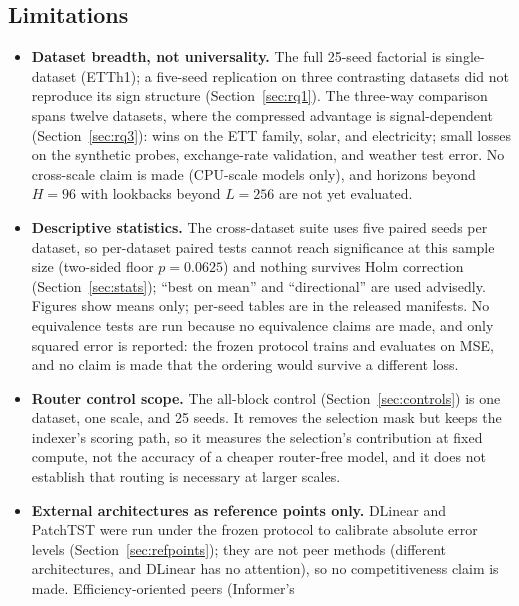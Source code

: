 \subsection{Limitations}
\label{sec:limitations}
\begin{itemize}
  \item \textbf{Dataset breadth, not universality.} The full 25-seed factorial is
        single-dataset (ETTh1); a five-seed replication on three contrasting datasets did
        not reproduce its sign structure (Section~\ref{sec:rq1}). The three-way comparison spans twelve
        datasets, where the compressed advantage is signal-dependent
        (Section~\ref{sec:rq3}): wins on the ETT family, solar, and
        electricity; small losses on the synthetic probes, exchange-rate
        validation, and weather test error. No cross-scale claim is made
        (CPU-scale models only), and horizons beyond $H{=}96$ with lookbacks
        beyond $L{=}256$ are not yet evaluated.
  \item \textbf{Descriptive statistics.} The cross-dataset suite uses five
        paired seeds per dataset, so per-dataset
        paired tests cannot reach significance at this sample size
        (two-sided floor $p = 0.0625$) and nothing survives Holm correction
        (Section~\ref{sec:stats}); ``best on mean'' and ``directional'' are
        used advisedly. Figures show means only; per-seed tables are in the
        released manifests. No equivalence tests are run because no
        equivalence claims are made, and only squared error is reported: the
        frozen protocol trains and evaluates on MSE, and no claim is made that
        the ordering would survive a different loss.
  \item \textbf{Router control scope.} The all-block control
        (Section~\ref{sec:controls}) is one dataset, one scale, and 25 seeds. It
        removes the selection mask but keeps the indexer's scoring path, so it
        measures the selection's contribution at fixed compute, not the
        accuracy of a cheaper router-free model, and it does not establish that
        routing is necessary at larger scales.
  \item \textbf{External architectures as reference points only.} DLinear
        and PatchTST were run under the frozen protocol to calibrate absolute
        error levels (Section~\ref{sec:refpoints}); they are not peer methods
        (different architectures, and DLinear has no attention), so no
        competitiveness claim is made. Efficiency-oriented peers (Informer's

\end{itemize}
